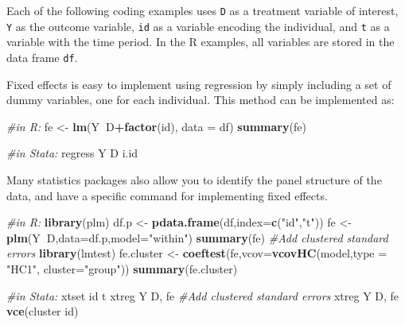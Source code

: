 \documentclass[]{book}
\newenvironment{Shaded}{\begin{snugshade}}{\end{snugshade}}
\newcommand{\KeywordTok}[1]{\textcolor[rgb]{0.13,0.29,0.53}{\textbf{#1}}}
\newcommand{\DataTypeTok}[1]{\textcolor[rgb]{0.13,0.29,0.53}{#1}}
\newcommand{\StringTok}[1]{\textcolor[rgb]{0.31,0.60,0.02}{#1}}
\newcommand{\CommentTok}[1]{\textcolor[rgb]{0.56,0.35,0.01}{\textit{#1}}}
\newcommand{\OperatorTok}[1]{\textcolor[rgb]{0.81,0.36,0.00}{\textbf{#1}}}
\newcommand{\NormalTok}[1]{#1}
\theoremstyle{definition}
\theoremstyle{definition}
\theoremstyle{definition}
\theoremstyle{remark}
\begin{document}
Each of the following coding examples uses \texttt{D} as a treatment
variable of interest, \texttt{Y} as the outcome variable, \texttt{id} as
a variable encoding the individual, and \texttt{t} as a variable with
the time period. In the R examples, all variables are stored in the data
frame \texttt{df}.

Fixed effects is easy to implement using regression by simply including
a set of dummy variables, one for each individual. This method can be
implemented as:

\begin{Shaded}
\begin{Highlighting}[]
\CommentTok{#in R:}
\NormalTok{fe <-}\StringTok{ }\KeywordTok{lm}\NormalTok{(Y}\OperatorTok{~}\NormalTok{D}\OperatorTok{+}\KeywordTok{factor}\NormalTok{(id), }\DataTypeTok{data =}\NormalTok{ df)}
\KeywordTok{summary}\NormalTok{(fe)}

\CommentTok{#in Stata:}
\NormalTok{regress Y D i.id}
\end{Highlighting}
\end{Shaded}

Many statistics packages also allow you to identify the panel structure
of the data, and have a specific command for implementing fixed effects.

\begin{Shaded}
\begin{Highlighting}[]
\CommentTok{#in R:}
\KeywordTok{library}\NormalTok{(plm)}
\NormalTok{df.p <-}\StringTok{ }\KeywordTok{pdata.frame}\NormalTok{(df,}\DataTypeTok{index=}\KeywordTok{c}\NormalTok{(}\StringTok{"id"}\NormalTok{,}\StringTok{"t"}\NormalTok{))}
\NormalTok{fe <-}\StringTok{ }\KeywordTok{plm}\NormalTok{(Y}\OperatorTok{~}\NormalTok{D,}\DataTypeTok{data=}\NormalTok{df.p,}\DataTypeTok{model=}\StringTok{"within"}\NormalTok{)}
\KeywordTok{summary}\NormalTok{(fe)}
\CommentTok{#Add clustered standard errors}
\KeywordTok{library}\NormalTok{(lmtest)}
\NormalTok{fe.cluster <-}\StringTok{ }\KeywordTok{coeftest}\NormalTok{(fe,}\DataTypeTok{vcov=}\KeywordTok{vcovHC}\NormalTok{(model,}\DataTypeTok{type =} \StringTok{"HC1"}\NormalTok{, }\DataTypeTok{cluster=}\StringTok{"group"}\NormalTok{))}
\KeywordTok{summary}\NormalTok{(fe.cluster)}

\CommentTok{#in Stata:}
\NormalTok{xtset id t}
\NormalTok{xtreg Y D, fe}
\CommentTok{#Add clustered standard errors}
\NormalTok{xtreg Y D, fe }\KeywordTok{vce}\NormalTok{(cluster id)}
\end{Highlighting}
\end{Shaded}
\end{document}
